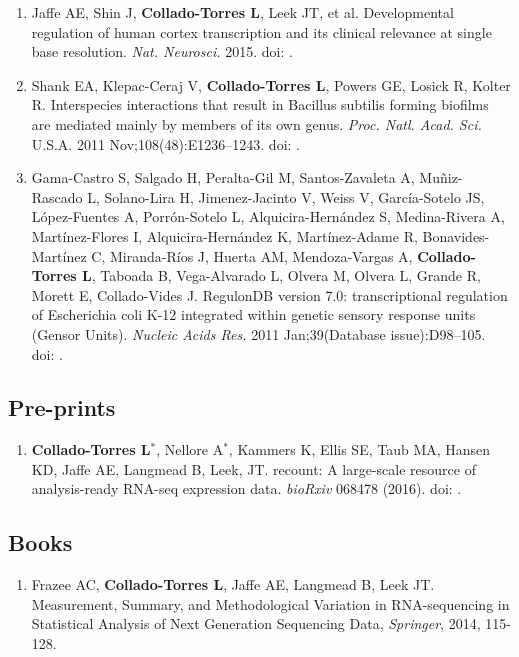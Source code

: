\begin{enumerate}
        \item Jaffe AE, Shin J, \textbf{Collado-Torres L}, Leek JT, et al. Developmental regulation of human cortex transcription and its clinical relevance at single base resolution. \emph{Nat. Neurosci.} 2015. doi: .
        
        \item Shank EA, Klepac-Ceraj V, \textbf{Collado-Torres L}, Powers GE, Losick R, Kolter R. Interspecies interactions that result in Bacillus subtilis forming biofilms are mediated mainly by members of its own genus. \emph{Proc. Natl. Acad. Sci.} U.S.A. 2011 Nov;108(48):E1236–1243. doi: .
        
        \item Gama-Castro S, Salgado H, Peralta-Gil M, Santos-Zavaleta A, Muñiz-Rascado L, Solano-Lira H, Jimenez-Jacinto V, Weiss V, Garc\'ia-Sotelo JS, L\'opez-Fuentes A, Porr\'on-Sotelo L, Alquicira-Hern\'andez S, Medina-Rivera A, Mart\'inez-Flores I, Alquicira-Hern\'andez K, Mart\'inez-Adame R, Bonavides-Mart\'inez C, Miranda-R\'ios J, Huerta AM, Mendoza-Vargas A, \textbf{Collado-Torres L}, Taboada B, Vega-Alvarado L, Olvera M, Olvera L, Grande R, Morett E, Collado-Vides J. RegulonDB version 7.0: transcriptional regulation of Escherichia coli K-12 integrated within genetic sensory response units (Gensor Units). \emph{Nucleic Acids Res.} 2011 Jan;39(Database issue):D98–105. doi: .
    \end{enumerate}
\subsection{Pre-prints}
    \begin{enumerate}
        \item \textbf{Collado-Torres L}$^{*}$, Nellore A$^{*}$, Kammers K, Ellis SE, Taub MA, Hansen KD, Jaffe AE, Langmead B, Leek, JT. recount: A large-scale resource of analysis-ready RNA-seq expression data. \emph{bioRxiv} 068478 (2016). doi: .
    \end{enumerate}
\subsection{Books}
    \begin{enumerate}
        \item Frazee AC, \textbf{Collado-Torres L}, Jaffe AE, Langmead B, Leek JT. Measurement, Summary, and Methodological Variation in RNA-sequencing in Statistical Analysis of Next Generation Sequencing Data, \emph{Springer}, 2014, 115-128.
    \end{enumerate}

